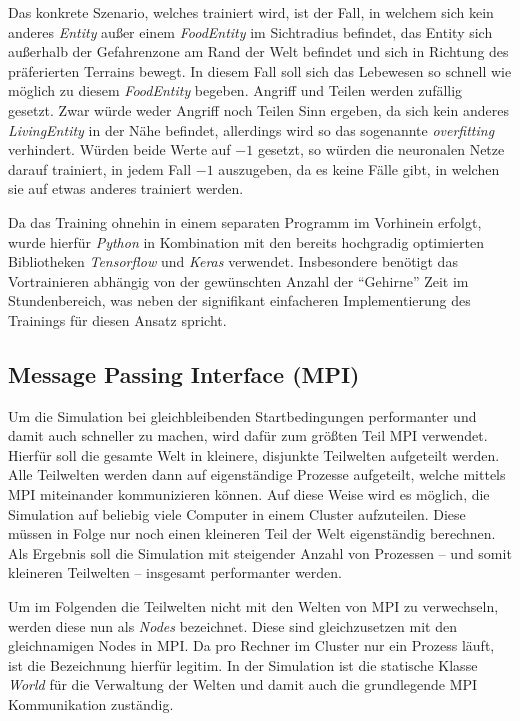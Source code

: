 \documentclass[course=erap]{aspdoc}
\begin{document}
Das konkrete Szenario, welches trainiert wird, ist der Fall, in welchem sich kein anderes \emph{Entity} außer einem \emph{FoodEntity} im Sichtradius befindet, das Entity sich außerhalb der Gefahrenzone am Rand der Welt befindet und sich in Richtung des präferierten Terrains bewegt. In diesem Fall soll sich das Lebewesen so schnell wie möglich zu diesem \emph{FoodEntity} begeben. Angriff und Teilen werden zufällig gesetzt. Zwar würde weder Angriff noch Teilen Sinn ergeben, da sich kein anderes \emph{LivingEntity} in der Nähe befindet, allerdings wird so das sogenannte \emph{overfitting} verhindert. Würden beide Werte auf $-1$ gesetzt, so würden die neuronalen Netze darauf trainiert, in jedem Fall $-1$ auszugeben, da es keine Fälle gibt, in welchen sie auf etwas anderes trainiert werden.

Da das Training ohnehin in einem separaten Programm im Vorhinein erfolgt, wurde hierfür \emph{Python} in Kombination mit den bereits hochgradig optimierten Bibliotheken \emph{Tensorflow} und \emph{Keras} verwendet. Insbesondere benötigt das Vortrainieren abhängig von der gewünschten Anzahl der "`Gehirne"' Zeit im Stundenbereich, was neben der signifikant einfacheren Implementierung des Trainings für diesen Ansatz spricht.

\subsection{Message Passing Interface (MPI)}
\label{subsec:mpi}
Um die Simulation bei gleichbleibenden Startbedingungen performanter und damit auch schneller zu machen, wird dafür zum größten Teil MPI verwendet. Hierfür soll die gesamte Welt in kleinere, disjunkte Teilwelten aufgeteilt werden. Alle Teilwelten werden dann auf eigenständige Prozesse aufgeteilt, welche mittels MPI miteinander kommunizieren können. Auf diese Weise wird es möglich, die Simulation auf beliebig viele Computer in einem Cluster aufzuteilen. Diese müssen in Folge nur noch einen kleineren Teil der Welt eigenständig berechnen. Als Ergebnis soll die Simulation mit steigender Anzahl von Prozessen -- und somit kleineren Teilwelten -- insgesamt performanter werden.

Um im Folgenden die Teilwelten nicht mit den Welten von MPI zu verwechseln, werden diese nun als \emph{Nodes} bezeichnet. Diese sind gleichzusetzen mit den gleichnamigen Nodes in MPI.
Da pro Rechner im Cluster nur ein Prozess läuft, ist die Bezeichnung hierfür legitim. In der Simulation ist die statische Klasse \emph{World} für die Verwaltung der Welten und damit auch die grundlegende MPI Kommunikation zuständig.
\end{document}
